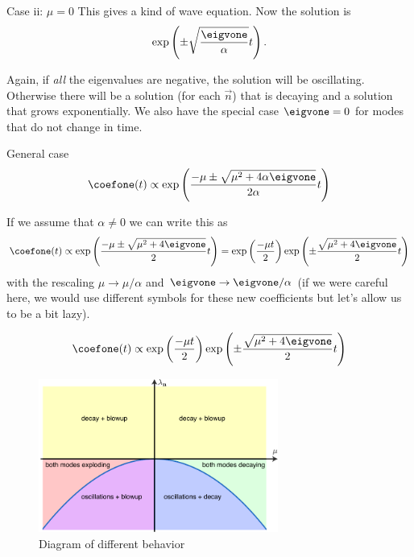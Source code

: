 \begin{frame}{Case ii: $ \mu = 0 $}
	This gives a kind of wave equation. Now the solution is 
	\[ \exp\left(\pm \sqrt{\frac{\eigvone}{\alpha}} t \right). \]
	
	Again, if \emph{all} the eigenvalues are negative, the solution will be oscillating. Otherwise there will be a solution (for each $ \vec{n} $) that is decaying and a solution that grows exponentially. We also have the special case $ \eigvone = 0 $ for modes that do not change in time. 
\end{frame}

\begin{frame}{General case}
	\[  
	\coefone(t) \propto \exp \left(
	\frac{-\mu \pm \sqrt{\mu^2 + 4 \alpha \eigvone}}{2\alpha} t
	\right)
	\]
	
	\pause
	If we assume that $ \alpha \neq 0 $ we can write this as 
	\[  
	\coefone(t) \propto \exp \left(
	\frac{-\mu \pm \sqrt{\mu^2 + 4 \eigvone}}{2} t
	\right) =  \exp \left(
	\frac{-\mu t}{2} \right) \exp \left( \pm \frac{\sqrt{\mu^2 + 4 \eigvone}}{2} t
	\right)
	\]
	with the rescaling $ \mu \to \mu/\alpha $ and $ \eigvone \to \eigvone/\alpha $ (if we were careful here, we would use different symbols for these new coefficients but let's allow us to be a bit lazy).
\end{frame}

\begin{frame}
	\[  
	\coefone(t) \propto  \exp \left(
	\frac{-\mu t}{2} \right) \exp \left( \pm \frac{\sqrt{\mu^2 + 4 \eigvone}}{2} t
	\right)
	\]
	\begin{figure}
		\includegraphics[width=0.7\textwidth]{phase_diagram}
		\caption{Diagram of different behavior}
	\end{figure}
\end{frame}

